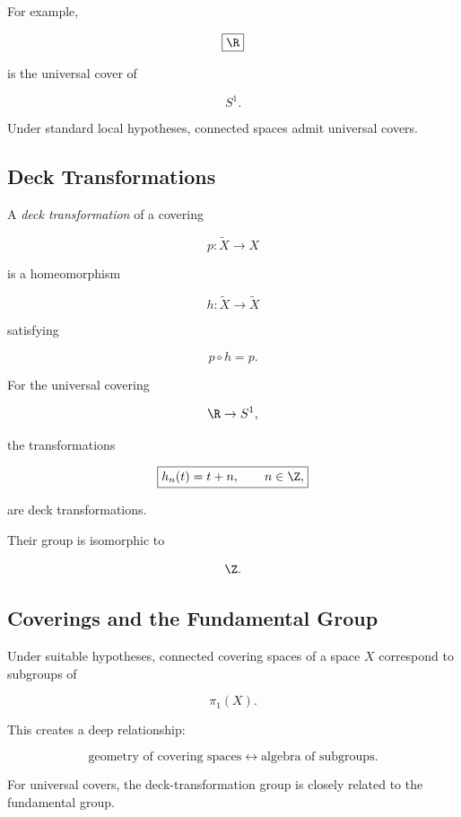 For example,

\[
\boxed{
\R
}
\]

is the universal cover of

\[
\boxed{
S^1.
}
\]

Under standard local hypotheses, connected spaces admit universal covers.

\subsection{Deck Transformations}
\label{subsec:deck-transformations}

A \emph{deck transformation} of a covering

\[
p:\widetilde{X}\to X
\]

is a homeomorphism

\[
h:\widetilde{X}\to\widetilde{X}
\]

satisfying

\[
\boxed{
p\circ h=p.
}
\]

For the universal covering

\[
\R\to S^1,
\]

the transformations

\[
\boxed{
h_n(t)=t+n,
\qquad
n\in\Z,
}
\]

are deck transformations.

Their group is isomorphic to

\[
\Z.
\]

\subsection{Coverings and the Fundamental Group}
\label{subsec:coverings-fundamental-group}

Under suitable hypotheses, connected covering spaces of a space \(X\)
correspond to subgroups of

\[
\pi_1(X).
\]

This creates a deep relationship:

\[
\boxed{
\text{geometry of covering spaces}
\longleftrightarrow
\text{algebra of subgroups}.
}
\]

For universal covers, the deck-transformation group is closely related to
the fundamental group.

